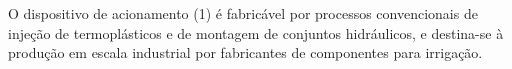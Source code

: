 

\pnum O dispositivo de acionamento (1) é fabricável por processos convencionais
de injeção de termoplásticos e de montagem de conjuntos hidráulicos, e destina-se
à produção em escala industrial por fabricantes de componentes para irrigação.
